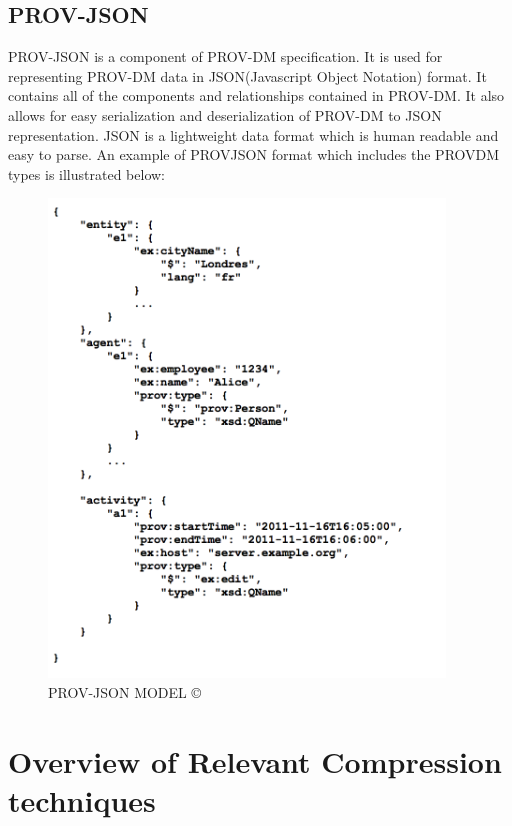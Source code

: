 \subsection{PROV-JSON}

PROV-JSON is a component of PROV-DM specification. It is used for representing PROV-DM data in JSON(Javascript Object Notation) format. It contains all of the components and relationships contained in PROV-DM. It also allows for easy serialization and deserialization of PROV-DM to JSON representation. JSON is a lightweight data format which is human readable and easy to parse. An example of PROV\-JSON format which includes the PROV\-DM types is illustrated below:

\begin{figure}[h]
\begin{center}

\includegraphics[height=5in]{prov_json.png}
\end{center}
\caption{PROV-JSON MODEL \copyright \cite{prov_json}}

\end{figure}



\section{Overview of Relevant Compression techniques}

